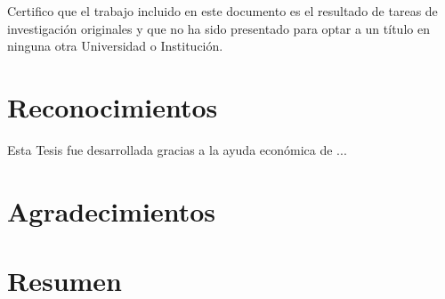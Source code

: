 \documentclass[spanish,a4paper,oneside,10pt,openright]{book}
\begin{document}
 \cleardoublepage


Certifico que el trabajo incluido en este documento es el resultado de tareas de investigación
originales y que no ha sido presentado para optar a un título en ninguna otra
Universidad o Institución.

\vspace{3cm}
\begin{flushright}
\tfcAuthor
\end{flushright}
\cleardoublepage


\chapter*{Reconocimientos}
Esta Tesis fue desarrollada gracias a la ayuda económica de ...


\clearpage
\thispagestyle{empty}
\phantom{p. 2}
\clearpage

\chapter*{Agradecimientos} %



\phantom{p. 1}
\clearpage
\thispagestyle{empty}
\phantom{p. 2}
\clearpage

\chapter*{Resumen} %


\phantom{p. 1}
\clearpage
\thispagestyle{empty}
\end{document}
